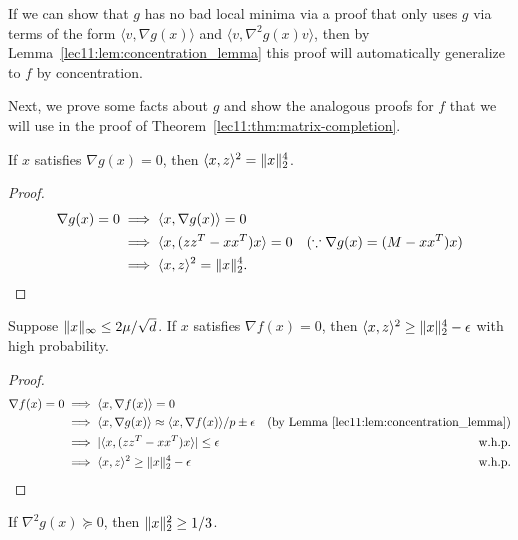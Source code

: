 If we can show that $g$ has no bad local minima via a proof that only uses $g$ via terms of the form $\langle v, \nabla g(x) \rangle$ and $\langle v, \nabla^2 g(x) v \rangle$, then by Lemma~\ref{lec11:lem:concentration_lemma} this proof will automatically generalize to $f$ by concentration.

Next, we prove some facts about $g$ and show the analogous proofs for $f$ that we will use in the proof of Theorem~\ref{lec11:thm:matrix-completion}.

\begin{lemma}\label{lec11:lem:inner-g}
If $x$ satisfies $\nabla g(x) = 0$, then $\langle x,z \rangle^2 = \|x\|_2^4$.
\end{lemma}

\begin{proof}
\begin{align}
    \nabla g(x) = 0 &\implies \langle x, \nabla g(x) \rangle = 0 \\
   & \implies \langle x, (zz^T-xx^T)x \rangle = 0 & (\because \nabla g(x) = (M - xx^T)x) \\
   & \implies \langle x,z \rangle^2 = \|x\|_2^4.
\end{align}
\end{proof}

\begin{lemma}\label{lec11:lem:inner-f}
Suppose $\|x\|_\infty \leq 2\mu / \sqrt{d}$. If $x$ satisfies $\nabla f(x) = 0$, then $\langle x,z \rangle^2 \geq \|x\|_2^4 - \epsilon$ with high probability.
\label{inner_prod_norm_f}
\end{lemma}

\begin{proof}
\begin{align}
    \nabla f(x) = 0 &\implies \langle x, \nabla f(x) \rangle = 0 \\
    & \implies \langle x, \nabla g(x) \rangle \approx \langle x, \nabla f(x) \rangle/p \pm \epsilon & \text{(by Lemma \ref{lec11:lem:concentration_lemma})} \\
   & \implies |\langle x, (zz^T-xx^T)x \rangle| \leq \epsilon & \text{w.h.p.} \\
   & \implies \langle x,z \rangle^2 \geq \|x\|_2^4 - \epsilon & \text{w.h.p.}
\end{align}
\end{proof}

\begin{lemma}\label{lec11:lem:bound-g}
    If $\nabla^2 g(x) \succeq 0$, then $\|x\|_2^2 \geq 1/3$.
\end{lemma}

